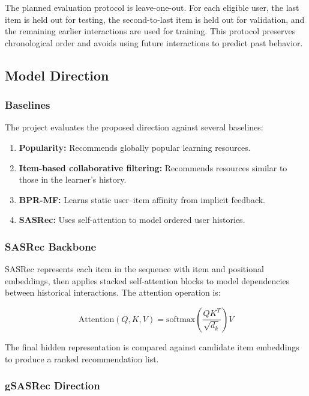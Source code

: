 The planned evaluation protocol is leave-one-out. For each eligible user, the last item is held out for testing, the second-to-last item is held out for validation, and the remaining earlier interactions are used for training. This protocol preserves chronological order and avoids using future interactions to predict past behavior.

\subsection{Model Direction}

\subsubsection{Baselines}

The project evaluates the proposed direction against several baselines:

\begin{enumerate}
    \item \textbf{Popularity:} Recommends globally popular learning resources.
    \item \textbf{Item-based collaborative filtering:} Recommends resources similar to those in the learner's history.
    \item \textbf{BPR-MF:} Learns static user--item affinity from implicit feedback.
    \item \textbf{SASRec:} Uses self-attention to model ordered user histories.
\end{enumerate}

\subsubsection{SASRec Backbone}

SASRec represents each item in the sequence with item and positional embeddings, then applies stacked self-attention blocks to model dependencies between historical interactions. The attention operation is:

$$\text{Attention}(Q, K, V) = \text{softmax}\left(\frac{QK^T}{\sqrt{d_k}}\right)V$$

The final hidden representation is compared against candidate item embeddings to produce a ranked recommendation list.

\subsubsection{gSASRec Direction}

